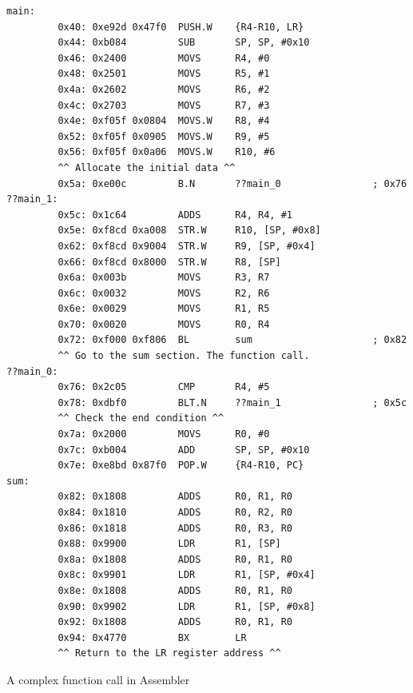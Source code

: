 \documentclass[12pt,a4paper]{report}
\begin{document}
\begin{normalsize}
\lstset{language=[x86masm]Assembler}
\begin{lstlisting}
main:
         0x40: 0xe92d 0x47f0  PUSH.W    {R4-R10, LR}
         0x44: 0xb084         SUB       SP, SP, #0x10
         0x46: 0x2400         MOVS      R4, #0
         0x48: 0x2501         MOVS      R5, #1
         0x4a: 0x2602         MOVS      R6, #2
         0x4c: 0x2703         MOVS      R7, #3
         0x4e: 0xf05f 0x0804  MOVS.W    R8, #4
         0x52: 0xf05f 0x0905  MOVS.W    R9, #5
         0x56: 0xf05f 0x0a06  MOVS.W    R10, #6
         ^^ Allocate the initial data ^^
         0x5a: 0xe00c         B.N       ??main_0                ; 0x76
??main_1:
         0x5c: 0x1c64         ADDS      R4, R4, #1
         0x5e: 0xf8cd 0xa008  STR.W     R10, [SP, #0x8]
         0x62: 0xf8cd 0x9004  STR.W     R9, [SP, #0x4]
         0x66: 0xf8cd 0x8000  STR.W     R8, [SP]
         0x6a: 0x003b         MOVS      R3, R7
         0x6c: 0x0032         MOVS      R2, R6
         0x6e: 0x0029         MOVS      R1, R5
         0x70: 0x0020         MOVS      R0, R4
         0x72: 0xf000 0xf806  BL        sum                     ; 0x82
         ^^ Go to the sum section. The function call. 
??main_0:
         0x76: 0x2c05         CMP       R4, #5
         0x78: 0xdbf0         BLT.N     ??main_1                ; 0x5c
         ^^ Check the end condition ^^
         0x7a: 0x2000         MOVS      R0, #0
         0x7c: 0xb004         ADD       SP, SP, #0x10
         0x7e: 0xe8bd 0x87f0  POP.W     {R4-R10, PC}
sum:
         0x82: 0x1808         ADDS      R0, R1, R0
         0x84: 0x1810         ADDS      R0, R2, R0
         0x86: 0x1818         ADDS      R0, R3, R0
         0x88: 0x9900         LDR       R1, [SP]
         0x8a: 0x1808         ADDS      R0, R1, R0
         0x8c: 0x9901         LDR       R1, [SP, #0x4]
         0x8e: 0x1808         ADDS      R0, R1, R0
         0x90: 0x9902         LDR       R1, [SP, #0x8]
         0x92: 0x1808         ADDS      R0, R1, R0
         0x94: 0x4770         BX        LR
         ^^ Return to the LR register address ^^
\end{lstlisting}	
\begin{center}
\small{A complex function call in Assembler}
\end{center}



\end{normalsize}
\end{document}
